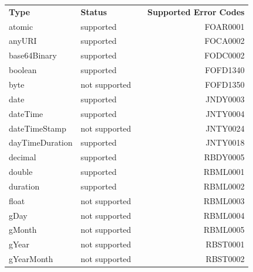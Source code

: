 \begin{table}[]
	\begin{tabular}{lllr}
		\textbf{Type}      & \textbf{Status} &  & \multicolumn{1}{c}{\textbf{Supported Error Codes}} \\
		atomic             & supported       &  & FOAR0001                                           \\
		anyURI             & supported       &  & FOCA0002                                           \\
		base64Binary       & supported       &  & FODC0002                                           \\
		boolean            & supported       &  & FOFD1340                                           \\
		byte               & not supported   &  & FOFD1350                                           \\
		date               & supported       &  & JNDY0003                                           \\
		dateTime           & supported       &  & JNTY0004                                           \\
		dateTimeStamp      & not supported   &  & JNTY0024                                           \\
		dayTimeDuration    & supported       &  & JNTY0018                                           \\
		decimal            & supported       &  & RBDY0005                                           \\
		double             & supported       &  & RBML0001                                           \\
		duration           & supported       &  & RBML0002                                           \\
		float              & not supported   &  & RBML0003                                           \\
		gDay               & not supported   &  & RBML0004                                           \\
		gMonth             & not supported   &  & RBML0005                                           \\
		gYear              & not supported   &  & RBST0001                                           \\
		gYearMonth         & not supported   &  & RBST0002                                           \\

\end{tabular}
\end{table}
